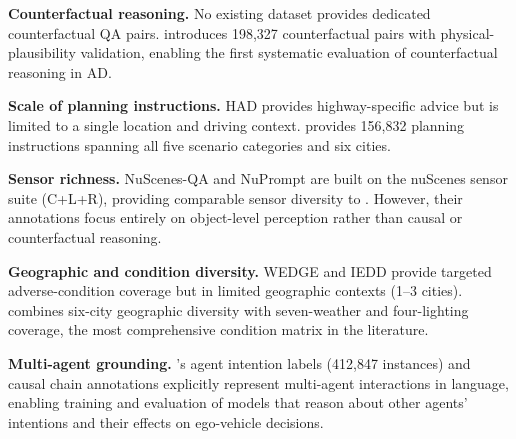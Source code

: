 \textbf{Counterfactual reasoning.} No existing dataset provides dedicated counterfactual
QA pairs. \lucid{} introduces 198,327 counterfactual pairs with physical-plausibility
validation, enabling the first systematic evaluation of counterfactual reasoning in AD.

\textbf{Scale of planning instructions.} HAD provides highway-specific advice
but is limited to a single location and driving context. \lucid{} provides 156,832
planning instructions spanning all five scenario categories and six cities.

\textbf{Sensor richness.} NuScenes-QA and NuPrompt are built on the nuScenes
sensor suite (C+L+R), providing comparable sensor diversity to \lucid{}.
However, their annotations focus entirely on object-level perception rather than
causal or counterfactual reasoning.

\textbf{Geographic and condition diversity.} WEDGE and IEDD provide targeted
adverse-condition coverage but in limited geographic contexts (1--3 cities).
\lucid{} combines six-city geographic diversity with seven-weather and four-lighting
coverage, the most comprehensive condition matrix in the literature.

\textbf{Multi-agent grounding.} \lucid{}'s agent intention labels (412,847 instances)
and causal chain annotations explicitly represent multi-agent interactions in language,
enabling training and evaluation of models that reason about other agents' intentions
and their effects on ego-vehicle decisions.
